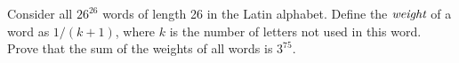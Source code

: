 Consider all \(26^{26}\) words of length 26 in the Latin
alphabet. Define the \(\emph{weight}\) of a word as \(1/(k+1)\), where \(k\)
is the number of letters not used in this word. Prove that the sum
of the weights of all words is \(3^{75}\).